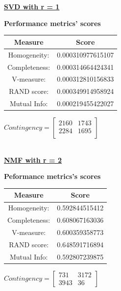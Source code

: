 \documentclass{report}
\begin{document}
\\  \\ \vspace{20pt}


\underline{\textbf{SVD with r = 1}} 

\begin{center}
	\textbf{Performance metrics' scores} \\  \vspace{10pt}
	\begin{tabular}{*{2}{c}}		
		\toprule
		\textbf{Measure} & \textbf{Score} \\
		\midrule
		Homogeneity: & 0.000310977615107 \\
		\mdirule 
		Completeness: & 0.000314664424341 \\
		\midrule
		V-measure: & 0.000312810156833  \\
		\midrule
		RAND score: & 0.000349914958924  \\
		\midrule
		Mutual Info:  & 0.000219455422027 \\
		\bottomrule
	\end{tabular}
	\qquad
	$Contingency = \left[\begin{array}{*{2}{c}}
		 2160	& 1743 \\
 		 2284 	& 1695 \\ 
			\end{array}\right]
		$
\end{center}

\newpage


\\
\underline{\textbf{NMF with r = 2}} 
\begin{center}
	\textbf{Peformance metrics's scores} \\  \vspace{10pt}
	\begin{tabular}{*{2}{c}}
		\toprule
		\textbf{Measure} & \textbf{Score} \\
		\midrule
		Homogeneity: & 0.592844515412 \\
		\midrule
		Completeness: & 0.608067163036 \\
		\midrule
		V-measure: 	& 0.600359358773 \\
		\midrule
		RAND score: & 0.648591716894 \\
		\midrule
		Mutual Info:	& 0.592807239875 \\
		\bottomrule
	\end{tabular}
	\qquad	
	$Contingency = \left[\begin{array}{*{2}{c}}
 		731	& 3172 \\
 		3943 & 36 
				\end{array}\right]
	$
\end{center}
\\  \\ \vspace{20pt}
\end{document}
